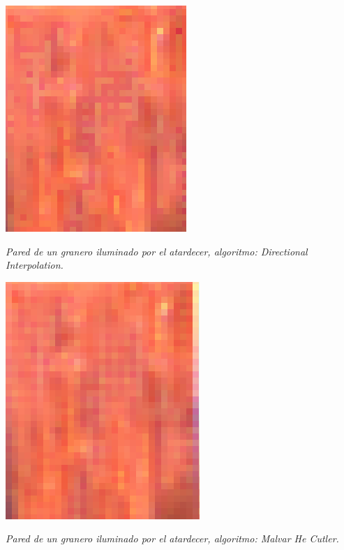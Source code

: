 	\begin{center}
		\includegraphics[scale=.5]{../enunciado/images_files/cualitativo/farm_directional.png}
		\vspace{2pt}
		\par
		\footnotesize\textit{Pared de un granero iluminado por el atardecer, algoritmo: Directional Interpolation.}
	\end{center}


	\begin{center}
		\includegraphics[scale=.5]{../enunciado/images_files/cualitativo/farm_malvar.png}
		\vspace{2pt}
		\par
		\footnotesize\textit{Pared de un granero iluminado por el atardecer, algoritmo: Malvar He Cutler.}
	\end{center}

\vspace{\baselineskip}

